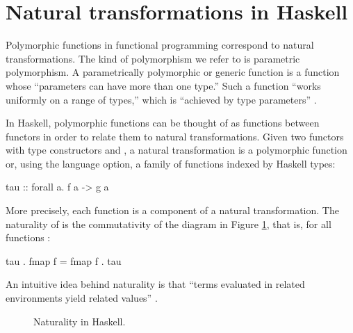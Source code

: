 \section{Natural transformations in Haskell}
\label{sec:naturals-haskell}

Polymorphic functions in functional programming correspond to natural
transformations. The kind of polymorphism we refer to is parametric
polymorphism. A parametrically polymorphic or generic function is a
function whose ``parameters can have more than one type.'' Such a
function ``works uniformly on a range of types,'' which is ``achieved
by type parameters'' \parencite[476]{cardelli-wegner-1985}.

In Haskell, polymorphic functions can be thought of as functions
between functors in order to relate them to natural transformations.
Given two functors with type constructors  and
, a natural transformation  is a
polymorphic function  or, using the
 language option, a family of functions
indexed by Haskell types:
\begin{codehaskell}
tau :: forall a. f a -> g a
\end{codehaskell}
More precisely, each  function is a component of a
natural transformation. The naturality of  is the
commutativity of the diagram in Figure \ref{fig:naturality-haskell},
that is, for all functions :
\begin{codehaskell}
tau . fmap f = fmap f . tau
\end{codehaskell}
An intuitive idea behind naturality is that ``terms evaluated in
related environments yield related values''
\parencite[347]{wadler-1989}.

\begin{figure}[htb]
  \begin{center}
  \end{center}
  \caption{Naturality in Haskell.}
  \label{fig:naturality-haskell}
\end{figure}

